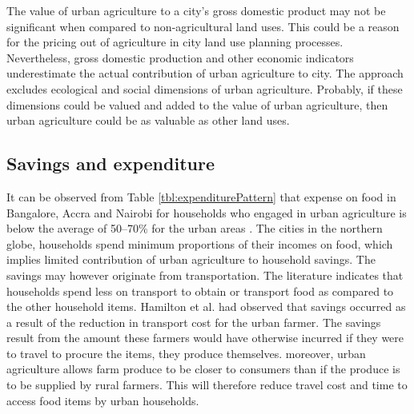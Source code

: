 The value of urban agriculture to a city's gross domestic product may not be significant when compared to non-agricultural land uses. This could be a reason for the pricing out of agriculture in city land use planning processes. Nevertheless, gross domestic production and other economic indicators underestimate the actual contribution of urban agriculture to city. The approach excludes ecological and social dimensions of urban agriculture. Probably, if these dimensions could be valued and added to the value of urban agriculture, then urban agriculture could be as valuable as other land uses.

\subsection{Savings and expenditure}

It can be observed from Table \ref{tbl:expenditurePattern} that expense on food in Bangalore, Accra and Nairobi for households who engaged in urban agriculture is below the average of 50–70\% for the urban areas \cite{FAO2003}. The cities in the northern globe, households spend minimum proportions of their incomes on food, which implies limited contribution of urban agriculture to household savings. The savings may however originate from transportation. The literature indicates that households spend less on transport to obtain or transport food as compared to the other household items. Hamilton et al. \cite{Hamilton2014} had observed that savings occurred as a result of the reduction in transport cost for the urban farmer. The savings result from the amount these farmers would have otherwise incurred if they were to travel to procure the items, they produce themselves. moreover, urban agriculture allows farm produce to be closer to consumers than if the produce is to be supplied by rural farmers. This will therefore reduce travel cost and time to access food items by urban households.

